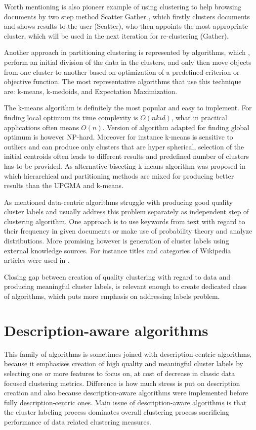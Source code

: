 \documentclass[a4paper, 12pt, oneside]{Thesis} %
\begin{document}
Worth mentioning is also pioneer example of using clustering to help browsing documents by two step method Scatter Gather \cite{cutting1992scatter}, which firstly clusters documents and shows results to the user (Scatter), who then appoints the most appropriate cluster, which will be used in the next iteration for re-clustering (Gather). 

Another approach in partitioning clustering is represented by algorithms, which \cite{jain1988algorithms}, \cite{jain1999data} perform an initial division of the data in the clusters, and only then move objects from one cluster to another based on optimization of a predefined criterion or objective function. The most representative algorithms that use this technique are: k-means, k-medoids, and Expectation Maximization.

The k-means algorithm is definitely the most popular and easy to implement. For finding local optimum its time complexity is $O(nkid)$, what in practical applications often means $O(n)$. Version of algorithm adapted for finding global optimum is however NP-hard. Moreover for instance k-means is sensitive to outliers and can produce only clusters that are hyper spherical, selection of the initial centroids often leads to different results and predefined number of clusters has to be provided. As alternative bisecting k-means algorithm \cite{li2008text} was proposed in which hierarchical and partitioning methods are mixed for producing better results than the UPGMA and k-means.

As mentioned data-centric algorithms struggle with producing good quality cluster labels and usually address this problem separately as independent step of clustering algorithm. One approach is to use keywords from text with regard to their frequency in given documents or make use of probability theory and analyze distributions. More promising however is generation of cluster labels using external knowledge sources. For instance titles and categories of Wikipedia articles were used in \cite{carmel2009enhancing}. 

Closing gap between creation of quality clustering with regard to data and producing meaningful cluster labels, is relevant enough to create dedicated class of algorithms, which puts more emphasis on addressing labels problem.

\section{Description-aware algorithms} This family of algorithms is sometimes joined with description-centric algorithms, because it emphasises creation of high quality and meaningful cluster labels by selecting one or more features to focus on, at cost of decrease in classic data focused clustering metrics. Difference is how much stress is put on description creation and also because description-aware algorithms were implemented before fully description-centric ones. Main issue of description-aware algorithms is that the cluster labeling process dominates overall clustering process sacrificing performance of data related clustering measures.
\end{document}
